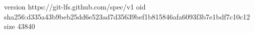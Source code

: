 version https://git-lfs.github.com/spec/v1
oid sha256:d335a43b9beb25dd6e523ad7d35639bef1b815846afa6093f3b7e1bdf7c10c12
size 43840
